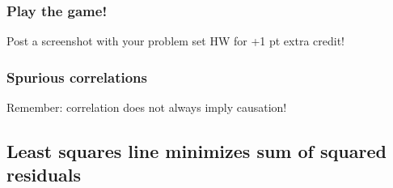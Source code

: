 \documentclass[slidestop,compress,mathserif,12pt,t,professionalfonts,xcolor=table]{beamer}
\begin{document}

\begin{frame}
\frametitle{Play the game!}

\vfill

Post a screenshot with your problem set HW for +1 pt extra credit!



\vfill

\end{frame}


\begin{frame}
\frametitle{Spurious correlations}

\vfill

Remember: correlation does not always imply causation!


\vfill

\end{frame}


\subsection{Least squares line minimizes sum of squared residuals}
\label{mi2}

\end{document}
